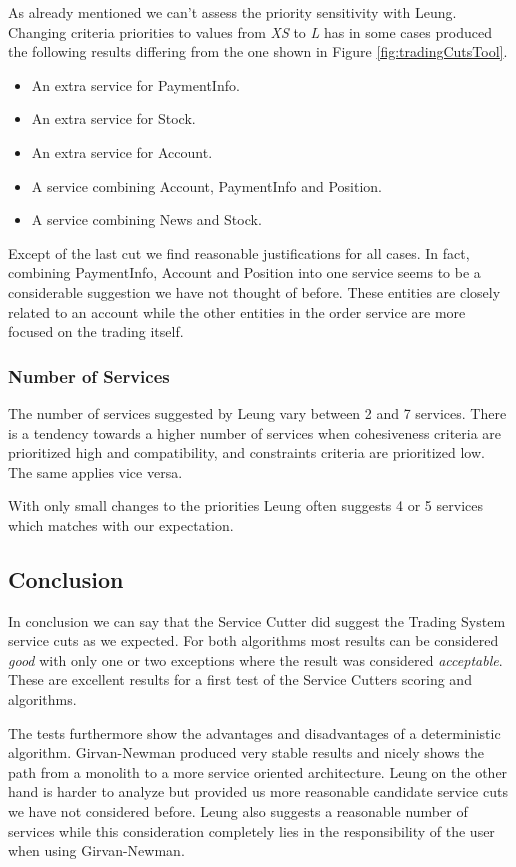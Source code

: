 As already mentioned we can't assess the priority sensitivity with Leung. Changing criteria priorities to values from \textit{XS} to \textit{L} has in some cases produced the following results differing from the one shown in Figure \ref{fig:tradingCutsTool}.

\begin{itemize}
	\item An extra service for PaymentInfo.
	\item An extra service for Stock.
	\item An extra service for Account.
	\item A service combining Account, PaymentInfo and Position.
	\item A service combining News and Stock.
\end{itemize}

Except of the last cut we find reasonable justifications for all cases. In fact, combining PaymentInfo, Account and Position into one service seems to be a considerable suggestion we have not thought of before. These entities are closely related to an account while the other entities in the order service are more focused on the trading itself. 

\subsubsection{Number of Services}

The number of services suggested by Leung vary between 2 and 7 services. There is a tendency towards a higher number of services when cohesiveness criteria are prioritized high and compatibility, and constraints criteria are prioritized low. The same applies vice versa. 

With only small changes to the priorities Leung often suggests 4 or 5 services which matches with our expectation. 

\subsection{Conclusion}

In conclusion we can say that the Service Cutter did suggest the Trading System service cuts as we expected. For both algorithms most results can be considered \textit{good} with only one or two exceptions where the result was considered \textit{acceptable}. These are excellent results for a first test of the Service Cutters scoring and algorithms. 

The tests furthermore show the advantages and disadvantages of a deterministic algorithm. Girvan-Newman produced very stable results and nicely shows the path from a monolith to a more service oriented architecture. Leung on the other hand is harder to analyze but provided us more reasonable candidate service cuts we have not considered before. Leung also suggests a reasonable number of services while this consideration completely lies in the responsibility of the user when using Girvan-Newman.

